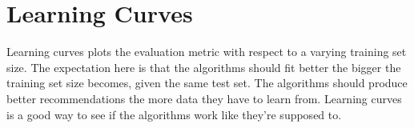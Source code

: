 
\section{Learning Curves}\label{sec:graphs:learning_curves}

Learning curves plots the evaluation metric with respect to a varying training set size. The expectation here is that the algorithms should fit better the bigger the training set size becomes, given the same test set. The algorithms should produce better recommendations the more data they have to learn from. Learning curves is a good way to see if the algorithms work like they're supposed to.













